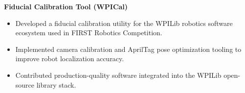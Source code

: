 \textbf{Fiducial Calibration Tool (WPICal)}
\begin{itemize}
  \item Developed a fiducial calibration utility for the WPILib robotics software ecosystem used in FIRST Robotics Competition.
  \item Implemented camera calibration and AprilTag pose optimization tooling to improve robot localization accuracy.
  \item Contributed production-quality software integrated into the WPILib open-source library stack.
\end{itemize}
